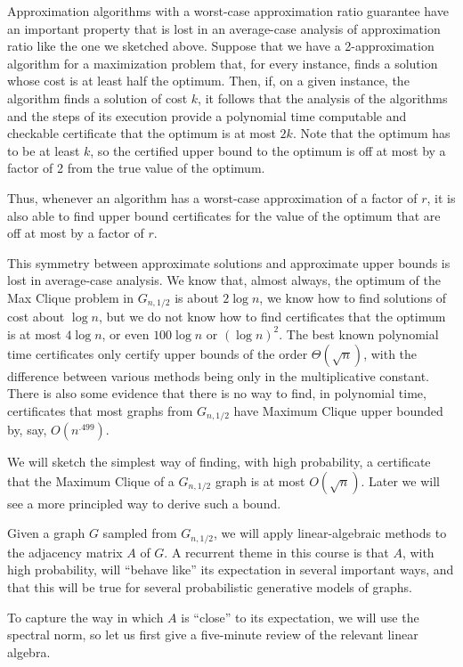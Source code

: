 Approximation algorithms with a worst-case approximation ratio guarantee have an important property that is lost in an average-case analysis of approximation ratio like the one we sketched above. Suppose that we have a 2-approximation algorithm for a maximization problem  that, for every instance, finds a solution whose cost is at least half the optimum. Then, if, on a given instance, the algorithm finds a solution of cost $k$, it follows that the analysis of the algorithms and the steps of its execution provide a polynomial time computable and checkable certificate that the optimum is at most $2k$. Note that the optimum has to be at least $k$, so the certified upper bound to the optimum is off at most by a factor of 2 from the true value of the optimum.

Thus, whenever an algorithm has a worst-case approximation of a factor of $r$, it is also able to find upper bound certificates for the value of the optimum that are off at most by a factor of $r$.

This symmetry between approximate solutions and approximate upper bounds is lost in average-case analysis. We know that, almost always, the optimum of the Max Clique problem in $G_{n,1/2}$ is about $2\log n$, we know how to find solutions of cost about $\log n$, but we do not know how to find certificates that the optimum is at most $4\log n$, or even $100 \log n$ or $(\log n)^2$. The best known polynomial time certificates only certify upper bounds of the order $\Theta(\sqrt n)$, with the difference between various methods being only in the multiplicative constant. There is also some evidence that there is no way to find, in polynomial time, certificates that most graphs from $G_{n,1/2}$ have Maximum Clique upper bounded by, say, $O(n^{.499})$.

We will sketch the simplest way of finding, with high probability, a certificate that the Maximum Clique of a $G_{n,1/2}$ graph is at most $O(\sqrt n)$. Later we will see a more principled way to derive such a bound.

Given a graph $G$ sampled from $G_{n,1/2}$, we will apply linear-algebraic methods to the adjacency matrix $A$ of $G$. A recurrent theme in this course is that $A$, with high probability, will ``behave like'' its expectation in several important ways, and that this will be true for several probabilistic generative models of graphs. 

To capture the way in which $A$ is ``close'' to its expectation, we will use the spectral norm, so let us first give a five-minute review of the relevant linear algebra. 

